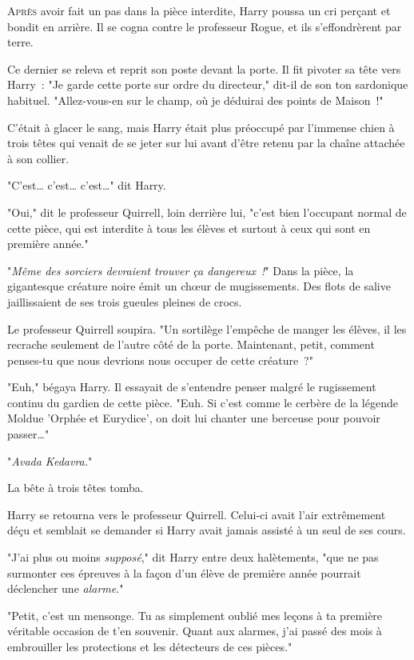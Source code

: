 
\lettrine{A}{près} avoir fait un pas dans la pièce interdite, Harry poussa un cri perçant et bondit en arrière. Il se cogna contre le professeur Rogue, et ils s'effondrèrent par terre.

Ce dernier se releva et reprit son poste devant la porte. Il fit pivoter sa tête vers Harry~: "Je garde cette porte sur ordre du directeur," dit-il de son ton sardonique habituel. "Allez-vous-en sur le champ, où je déduirai des points de Maison~!"

C'était à glacer le sang, mais Harry était plus préoccupé par l'immense chien à trois têtes qui venait de se jeter sur lui avant d'être retenu par la chaîne attachée à son collier.

"C'est… c'est… c'est…" dit Harry.

"Oui," dit le professeur Quirrell, loin derrière lui, "c'est bien l'occupant normal de cette pièce, qui est interdite à tous les élèves et surtout à ceux qui sont en première année."

"\emph{Même des sorciers devraient trouver ça dangereux~!}" Dans la pièce, la gigantesque créature noire émit un chœur de mugissements. Des flots de salive jaillissaient de ses trois gueules pleines de crocs.

Le professeur Quirrell soupira. "Un sortilège l'empêche de manger les élèves, il les recrache seulement de l'autre côté de la porte. Maintenant, petit, comment penses-tu que nous devrions nous occuper de cette créature~?"

"Euh," bégaya Harry. Il essayait de s'entendre penser malgré le rugissement continu du gardien de cette pièce. "Euh. Si c'est comme le cerbère de la légende Moldue 'Orphée et Eurydice', on doit lui chanter une berceuse pour pouvoir passer…"

"\emph{Avada Kedavra.}"

La bête à trois têtes tomba.

Harry se retourna vers le professeur Quirrell. Celui-ci avait l'air extrêmement déçu et semblait se demander si Harry avait jamais assisté à un seul de ses cours.

"J'ai plus ou moins \emph{supposé}," dit Harry entre deux halètements, "que ne pas surmonter ces épreuves à la façon d'un élève de première année pourrait déclencher une \emph{alarme}."

"Petit, c'est un mensonge. Tu as simplement oublié mes leçons à ta première véritable occasion de t'en souvenir. Quant aux alarmes, j'ai passé des mois à embrouiller les protections et les détecteurs de ces pièces."

